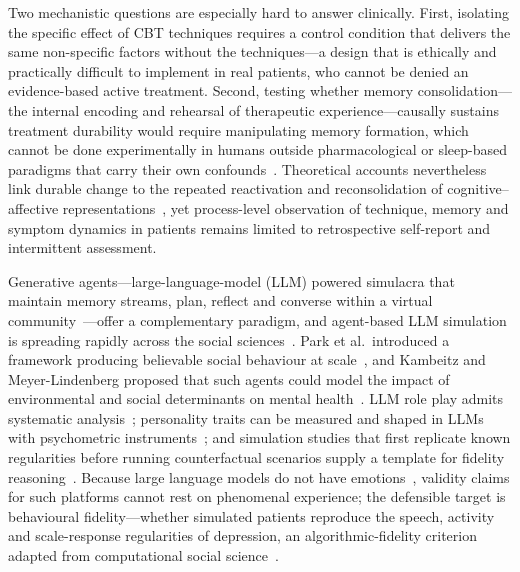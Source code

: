 \documentclass[sn-nature,pdflatex]{sn-jnl}
\begin{document}
Two mechanistic questions are especially hard to answer clinically. First, isolating the specific effect of CBT techniques requires a control condition that delivers the same non-specific factors without the techniques---a design that is ethically and practically difficult to implement in real patients, who cannot be denied an evidence-based active treatment. Second, testing whether memory consolidation---the internal encoding and rehearsal of therapeutic experience---causally sustains treatment durability would require manipulating memory formation, which cannot be done experimentally in humans outside pharmacological or sleep-based paradigms that carry their own confounds~\cite{rasch2013}. Theoretical accounts nevertheless link durable change to the repeated reactivation and reconsolidation of cognitive--affective representations~\cite{teasdale1988,spens2024}, yet process-level observation of technique, memory and symptom dynamics in patients remains limited to retrospective self-report and intermittent assessment.

Generative agents---large-language-model (LLM) powered simulacra that maintain memory streams, plan, reflect and converse within a virtual community~\cite{park2023}---offer a complementary paradigm, and agent-based LLM simulation is spreading rapidly across the social sciences~\cite{gao2024}. Park et al.\ introduced a framework producing believable social behaviour at scale~\cite{park2023}, and Kambeitz and Meyer-Lindenberg proposed that such agents could model the impact of environmental and social determinants on mental health~\cite{kambeitz2025npj}. LLM role play admits systematic analysis~\cite{shanahan2023}; personality traits can be measured and shaped in LLMs with psychometric instruments~\cite{serapio2025,wright2026}; and simulation studies that first replicate known regularities before running counterfactual scenarios supply a template for fidelity reasoning~\cite{qu2024,ji2026}. Because large language models do not have emotions~\cite{goldenberg2026}, validity claims for such platforms cannot rest on phenomenal experience; the defensible target is behavioural fidelity---whether simulated patients reproduce the speech, activity and scale-response regularities of depression, an algorithmic-fidelity criterion adapted from computational social science~\cite{qu2024}.
\end{document}
